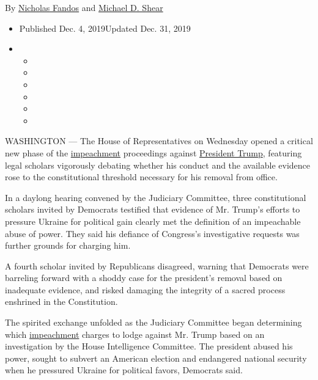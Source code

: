 By \href{https://www.nytimes3xbfgragh.onion/by/nicholas-fandos}{Nicholas
Fandos} and
\href{https://www.nytimes3xbfgragh.onion/by/michael-d-shear}{Michael D.
Shear}

\begin{itemize}
\item
  Published Dec. 4, 2019Updated Dec. 31, 2019
\item
  \begin{itemize}
  \item
  \item
  \item
  \item
  \item
  \item
  \end{itemize}
\end{itemize}

WASHINGTON --- The House of Representatives on Wednesday opened a
critical new phase of the
\href{https://www.nytimes3xbfgragh.onion/2019/12/13/us/politics/impeachment-vote.html}{impeachment}
proceedings against
\href{https://www.nytimes3xbfgragh.onion/2019/12/13/us/politics/impeachment-vote.html}{President
Trump}, featuring legal scholars vigorously debating whether his conduct
and the available evidence rose to the constitutional threshold
necessary for his removal from office.

In a daylong hearing convened by the Judiciary Committee, three
constitutional scholars invited by Democrats testified that evidence of
Mr. Trump's efforts to pressure Ukraine for political gain clearly met
the definition of an impeachable abuse of power. They said his defiance
of Congress's investigative requests was further grounds for charging
him.

A fourth scholar invited by Republicans disagreed, warning that
Democrats were barreling forward with a shoddy case for the president's
removal based on inadequate evidence, and risked damaging the integrity
of a sacred process enshrined in the Constitution.

The spirited exchange unfolded as the Judiciary Committee began
determining which
\href{https://www.nytimes3xbfgragh.onion/2019/12/13/us/politics/impeachment-vote.html}{impeachment}
charges to lodge against Mr. Trump based on an investigation by the
House Intelligence Committee. The president abused his power, sought to
subvert an American election and endangered national security when he
pressured Ukraine for political favors, Democrats said.

